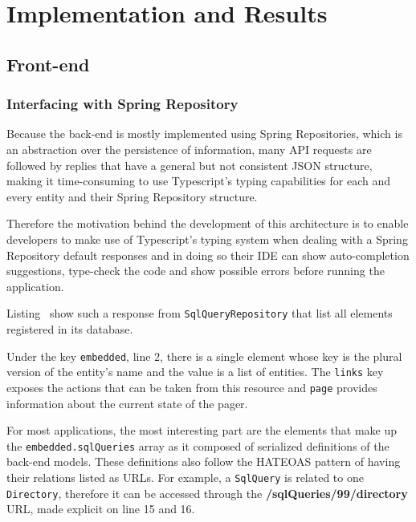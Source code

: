 \chapter{Implementation and Results}\label{cha:implementation}

\section{Front-end}\label{cha:implementation:sec:front-end}

\subsection{Interfacing with Spring Repository}
Because the back-end is mostly implemented using Spring Repositories, which is an abstraction over the persistence of information, many \gls{API} requests are followed by replies that have a general but not consistent \gls{JSON} structure, making it time-consuming to use Typescript's typing capabilities for each and every entity and their Spring Repository structure.

Therefore the motivation behind the development of this architecture is to enable developers to make use of Typescript's typing system when dealing with a Spring Repository default responses and in doing so their \gls{IDE} can show auto-completion suggestions, type-check the code and show possible errors before running the application.

Listing~\cite{code:json} show such a response from \texttt{SqlQueryRepository} that list all elements registered in its database.

Under the key \texttt{\textunderscore embedded}, line 2, there is a single element whose key is the plural version of the entity's name and the value is a list of entities. The \texttt{\textunderscore links} key exposes the actions that can be taken from this resource and \texttt{page} provides information about the current state of the pager.

For most applications, the most interesting part are the elements that make up the \texttt{\textunderscore embedded.sqlQueries} array as it composed of serialized definitions of the back-end models. These definitions also follow the \gls{HATEOAS} pattern of having their relations listed as \gls{URL}s. For example, a \texttt{SqlQuery} is related to one \texttt{Directory},  therefore it can be accessed through the \textbf{/sqlQueries/99/directory} \gls{URL}, made explicit on line 15 and 16.


